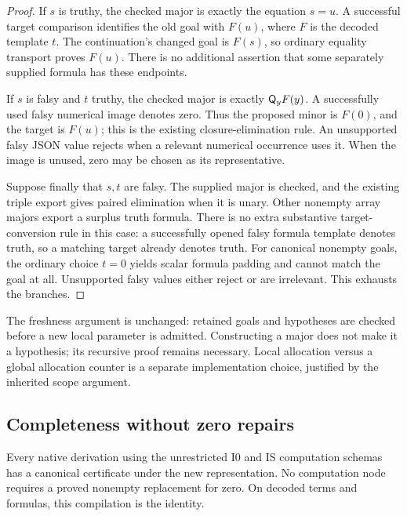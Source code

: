 \begin{proof}
If \(s\) is truthy, the checked major is exactly the equation \(s=u\).
A successful target comparison identifies the old goal with \(F(u)\),
where \(F\) is the decoded template \(t\).
The continuation's changed goal is \(F(s)\), so ordinary equality
transport proves \(F(u)\).  There is no additional assertion that
some separately supplied formula has these endpoints.

If \(s\) is falsy and \(t\) truthy, the checked major is exactly
\(\mathsf Q_yF(y)\).  A successfully used falsy numerical image denotes
zero.  Thus the proposed minor is \(F(0)\), and the target is \(F(u)\);
this is the existing closure-elimination rule.  An unsupported falsy
JSON value rejects when a relevant numerical occurrence uses it.
When the image is unused, zero may be chosen as its representative.

Suppose finally that \(s,t\) are falsy.  The supplied major is checked,
and the existing triple export gives paired elimination when it is
unary.  Other nonempty array majors export a surplus truth formula.
There is no extra substantive target-conversion rule in this case:
a successfully opened falsy formula template denotes truth, so a
matching target already denotes truth.  For canonical nonempty goals,
the ordinary choice \(t=0\) yields scalar formula padding and cannot
match the goal at all.  Unsupported falsy values either reject or are
irrelevant.  This exhausts the branches.
\end{proof}

The freshness argument is unchanged: retained goals and hypotheses
are checked before a new local parameter is admitted.  Constructing
a major does not make it a hypothesis; its recursive proof remains
necessary.  Local allocation versus a global allocation counter is
a separate implementation choice, justified by the inherited scope
argument.

\subsection{Completeness without zero repairs}

\begin{theorem}
\label{truthy:complete}
Every native derivation using the unrestricted I0 and IS computation
schemas has a canonical certificate under the new representation.
No computation node requires a proved nonempty replacement for zero.
On decoded terms and formulas, this compilation is the identity.
\end{theorem}

